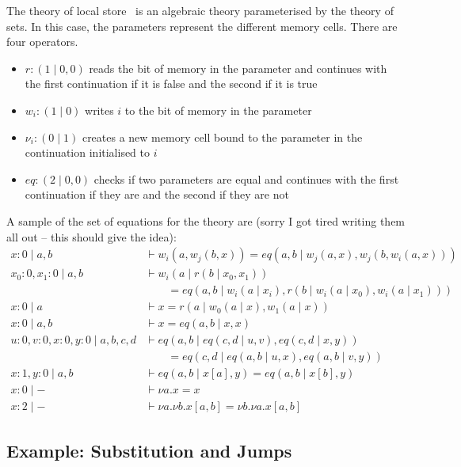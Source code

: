 \documentclass{scrartcl}
\theoremstyle{definition}
\begin{document}
The theory of local store~\cite{staton_instances_2013} is an algebraic theory parameterised by the theory of sets. In this case, the parameters represent the different memory cells. There are four operators.
\begin{itemize}
    \item $r : (1\mid 0, 0)$ reads the bit of memory in the parameter and continues with the first continuation if it is false and the second if it is true
    \item $w_i : (1 \mid 0)$ writes $i$ to the bit of memory in the parameter
    \item $\nu_i : (0 \mid 1)$ creates a new memory cell bound to the parameter in the continuation initialised to $i$
    \item $eq : (2\mid 0, 0)$ checks if two parameters are equal and continues with the first continuation if they are and the second if they are not
\end{itemize}
A sample of the set of equations for the theory are (sorry I got tired writing them all out -- this should give the idea):
\begin{align*}
    x: 0 \mid a, b &\vdash w_i(a,w_j(b, x)) = eq(a,b\mid w_j(a, x), w_j(b, w_i(a,x))) \\
    x_0:0,x_1:0\mid a,b &\vdash w_i(a\mid r(b\mid x_0,x_1)) \\
    &\qquad = eq(a,b\mid w_i(a\mid x_i), r(b \mid w_i(a\mid x_0), w_i(a\mid x_1))) \\
    x:0 \mid a &\vdash x = r(a\mid w_0(a\mid x), w_1(a\mid x)) \\
    x:0 \mid a,b &\vdash x = eq(a,b\mid x,x) \\
    u:0,v:0,x:0,y:0\mid a,b,c,d &\vdash eq(a,b \mid eq(c,d \mid u,v), eq(c,d \mid x,y)) \\
    &\qquad = eq(c,d\mid eq(a,b\mid u,x), eq(a,b\mid v,y)) \\
    x:1,y:0 \mid a,b &\vdash eq(a,b\mid x[a],y) = eq(a,b\mid x[b],y) \\
    x: 0 \mid - &\vdash \nu a.x = x \\
    x: 2 \mid - &\vdash \nu a.\nu b.x[a,b] = \nu b.\nu a.x[a,b]
\end{align*}

\subsection{Example: Substitution and Jumps}
\end{document}
